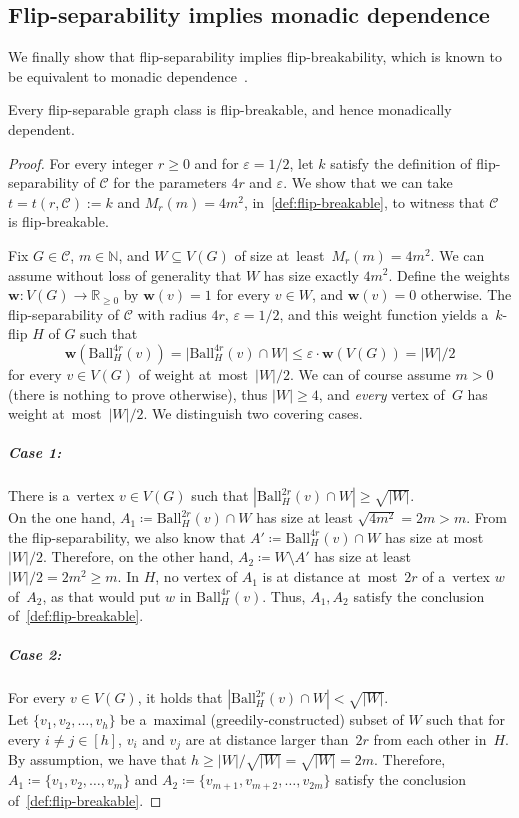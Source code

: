 \documentclass[a4paper,UKenglish,cleveref, autoref, thm-restate]{lipics-v2021}
\newcommand{\eps}{\varepsilon}
\newcommand{\R}{\mathbb{R}}
\newcommand{\NN}[0]{\mathrm{\mathbb{N}}}
\newcommand{\weight}{\mathbf{w}}
\renewcommand{\le}{\leqslant}
\renewcommand{\leq}{\le}
\renewcommand{\ge}{\geqslant}
\renewcommand{\geq}{\ge}
\newcommand{\Ball}{\mathrm{Ball}}
\begin{document}
\subsection{Flip-separability implies monadic dependence}

We finally show that flip-separability implies flip-breakability, which is known to be equivalent to monadic dependence~\cite{flip-breakability}.

\begin{lemma}\label{lem:sep-implies-break}
   Every flip-separable graph class is flip-breakable, and hence monadically dependent. 
\end{lemma}
\begin{proof}
  For every integer $r \geq 0$ and for $\eps = 1/2$, let $k$ satisfy the definition of flip-separability of $\mathcal C$ for the parameters \emph{$4r$} and $\eps$.
  We show that we can take $t = t(r,\mathcal C) := k$ and $M_r(m) = 4m^2$, in~\cref{def:flip-breakable}, to witness that $\mathcal C$ is flip-breakable. 

  Fix $G \in \mathcal C$, $m \in \NN$, and $W \subseteq V(G)$ of size at~least~$M_r(m) = 4m^2$.
  We can assume without loss of generality that $W$ has size exactly $4m^2$.
  Define the weights $\weight \colon V(G) \to \R_{\geq 0}$ by $\weight(v)=1$ for every $v \in W$, and $\weight(v)=0$ otherwise.
  The flip-separability of $\mathcal C$ with radius $4r$, $\eps=1/2$, and this weight function yields a~$k$-flip $H$ of $G$ such that
  \[\weight(\Ball_H^{4r}(v)) = \big|\Ball_H^{4r}(v) \cap W\big| \leq \eps \cdot \weight(V(G))=|W|/2\]
  for every $v \in V(G)$ of weight at~most~$|W|/2$.
  We can of course assume $m > 0$ (there is nothing to prove otherwise), thus $|W| \geqslant 4$, and \emph{every} vertex of~$G$ has weight at~most~$|W|/2$.
  We distinguish two covering cases.
  
  \subparagraph*{Case 1:} There is a~vertex $v \in V(G)$ such that $|\Ball_H^{2r}(v) \cap W| \geq \sqrt{|W|}$.\\
  On the one hand, $A_1 \coloneqq \Ball^{2r}_H(v) \cap W$ has size at least $\sqrt{4m^2} = 2m > m$.
  From the flip-separability, we also know that $A' \coloneqq \Ball^{4r}_H(v) \cap W$ has size at most $|W|/2$.
  Therefore, on the other hand, $A_2 \coloneqq W \setminus A'$ has size at least $|W|/2 = 2m^2 \geq m$.
  In $H$, no vertex of $A_1$ is at distance at~most~$2r$ of a~vertex $w$ of~$A_2$, as that would put $w$ in $\Ball^{4r}_H(v)$. 
  Thus, $A_1, A_2$ satisfy the conclusion of~\cref{def:flip-breakable}.
  
  \subparagraph*{Case 2:} For every $v \in V(G)$, it holds that $|\Ball_H^{2r}(v) \cap W| < \sqrt{|W|}$.\\
  Let $\{v_1, v_2, \ldots, v_h\}$ be a~maximal (greedily-constructed) subset of $W$ such that for every $i \neq j \in [h]$, $v_i$ and $v_j$ are at distance larger than~$2r$ from each other in~$H$.
  By assumption, we have that $h \geq |W|/\sqrt{|W|} = \sqrt{|W|} = 2m$.
  Therefore, $A_1 \coloneqq \{v_1, v_2, \ldots, v_m\}$ and $A_2 \coloneqq \{v_{m+1}, v_{m+2}, \ldots, v_{2m}\}$ satisfy the conclusion of~\cref{def:flip-breakable}.
\end{proof}
\end{document}
